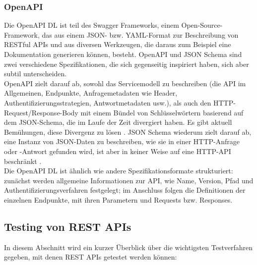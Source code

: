 \subsubsection{OpenAPI}

Die OpenAPI DL ist teil des Swagger Frameworks, einem Open-Source-Framework, das aus einem JSON- bzw. YAML-Format zur Beschreibung von RESTful APIs und aus diversen Werkzeugen, die daraus zum Beispiel eine Dokumentation generieren können, besteht. OpenAPI und JSON Schema sind zwei verschiedene Spezifikationen, die sich gegenseitig inspiriert haben, sich aber subtil unterscheiden. \\

OpenAPI zielt darauf ab, sowohl das Servicemodell zu beschreiben (die API im Allgemeinen, Endpunkte, Anfragemetadaten wie Header, Authentifizierungsstrategien, Antwortmetadaten usw.), als auch den HTTP-Request/Response-Body mit einem Bündel von Schlüsselwörtern basierend auf dem JSON-Schema, die im Laufe der Zeit divergiert haben. Es gibt aktuell Bemühungen, diese Divergenz zu lösen \parencite{sturgeon2018divergence}. JSON Schema wiederum zielt darauf ab, eine Instanz von JSON-Daten zu beschreiben, wie sie in einer HTTP-Anfrage oder -Antwort gefunden wird, ist aber in keiner Weise auf eine HTTP-API beschränkt \parencite{sturgeon2018harmony}. \\

Die OpenAPI DL ist ähnlich wie andere Spezifikationsformate strukturiert: zunächst werden allgemeine Informationen zur API, wie Name, Version, Pfad und Authentifizierungsverfahren festgelegt; im Anschluss folgen die Definitionen der einzelnen Endpunkte, mit ihren Parametern und Requests bzw. Responses.

\subsection{Testing von REST APIs}

In diesem Abschnitt wird ein kurzer Überblick über die wichtigsten Testverfahren gegeben, mit denen REST APIs getestet werden können:

